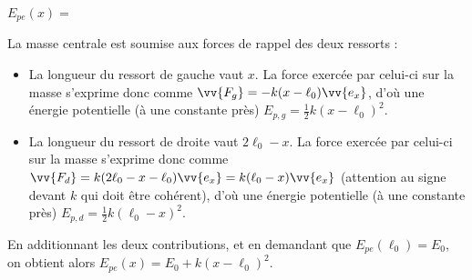 


\begin{enonce}
$E_{pe}(x) = $
\end{enonce}


\begin{corrige}
La masse centrale est soumise aux forces de rappel des deux ressorts :
\begin{itemize}
\item La longueur du ressort de gauche vaut $x$. La force exercée par celui-ci sur la masse s'exprime donc comme $\vv{F_g}=-k(x-\ell_0)\vv{e_x}$, d'où une énergie potentielle (à une constante près) $E_{p,g} = \frac{1}{2}k(x-\ell_0)^2$.

\item La longueur du ressort de droite vaut $2\ell_0-x$. La force exercée par celui-ci sur la masse s'exprime donc comme $\vv{F_d}=k(2\ell_0-x-\ell_0)\vv{e_x} = k(\ell_0-x)\vv{e_x}$ (attention au signe devant $k$ qui doit être cohérent), d'où une énergie potentielle (à une constante près) $E_{p,d} = \frac{1}{2}k(\ell_0-x)^2$.
\end{itemize}
En additionnant les deux contributions, et en demandant que $E_{pe}(\ell_0)=E_0$, on obtient alors $E_{pe}(x) = E_0+k(x-\ell_0)^2$.
\end{corrige}


\finEntrainement



\newpage









